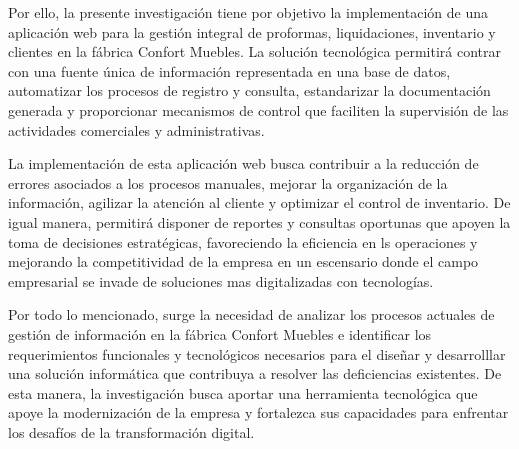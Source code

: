 Por ello, la presente investigación tiene por objetivo la implementación de una aplicación web para la gestión integral de proformas, liquidaciones, inventario y clientes en la fábrica Confort Muebles. La solución tecnológica permitirá contrar con una fuente única de información representada en una base de datos, automatizar los procesos de registro y consulta, estandarizar la documentación generada y proporcionar mecanismos de control que faciliten la supervisión de las actividades comerciales y administrativas.

La implementación de esta aplicación web busca contribuir a la reducción de errores asociados a los procesos manuales, mejorar la organización de la información, agilizar la atención al cliente y optimizar el control de inventario. De igual manera, permitirá disponer de reportes y consultas oportunas que apoyen la toma de decisiones estratégicas, favoreciendo la eficiencia en ls operaciones y mejorando la competitividad de la empresa en un escensario donde el campo empresarial se invade de  soluciones mas digitalizadas con tecnologías.

Por todo lo mencionado, surge la necesidad de analizar los procesos actuales de gestión de información en la fábrica Confort Muebles e identificar los requerimientos funcionales y tecnológicos necesarios para el diseñar y desarrolllar una solución informática que contribuya a resolver las deficiencias existentes. De esta manera, la investigación busca aportar una herramienta tecnológica que apoye la modernización de la empresa y fortalezca sus capacidades para enfrentar los desafíos de la transformación digital.
